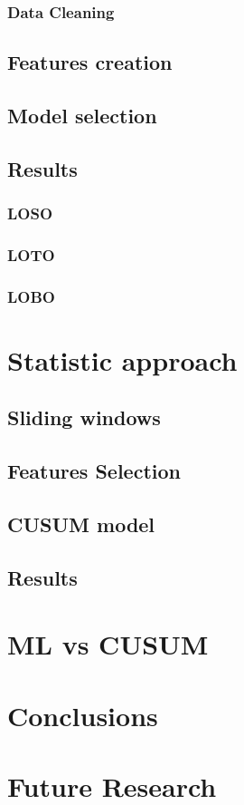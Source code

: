 \documentclass[12pt]{article}
\begin{document}
                \subsubsection{Data Cleaning}
            \subsection{Features creation}
            \subsection{Model selection}
            \subsection{Results}
                \subsubsection{LOSO}
                \subsubsection{LOTO}
                \subsubsection{LOBO}
        \newpage
        \section{Statistic approach}
            \subsection{Sliding windows}
            \subsection{Features Selection}
            \subsection{CUSUM model}
            \subsection{Results}
        \section{ML vs CUSUM}
        \section{Conclusions}
        \section{Future Research}
        
\end{document}
